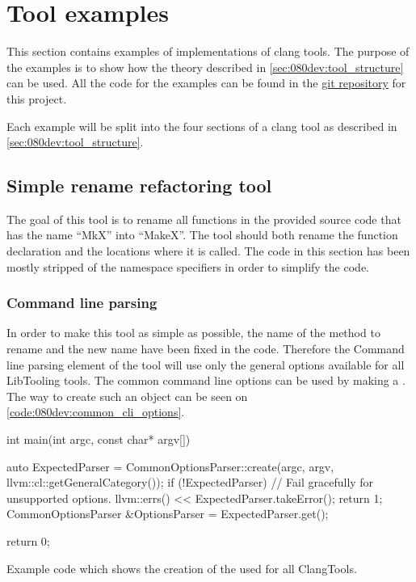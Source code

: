 \section{Tool examples}

This section contains examples of implementations of clang tools. The purpose of the examples is to show how the theory described in \cref{sec:080dev:tool_structure} can be used. All the code for the examples can be found in the \href{https://github.com/mortenhaahr/RD/tree/main/examples}{git repository} for this project. 

Each example will be split into the four sections of a clang tool as described in \cref{sec:080dev:tool_structure}.

\subsection{Simple rename refactoring tool}

The goal of this tool is to rename all functions in the provided source code that has the name ``MkX'' into ``MakeX''. The tool should both rename the function declaration and the locations where it is called. The code in this section has been mostly stripped of the namespace specifiers in order to simplify the code.

\subsubsection*{Command line parsing}

In order to make this tool as simple as possible, the name of the method to rename and the new name have been fixed in the code. Therefore the Command line parsing element of the tool will use only the general options available for all LibTooling tools. The common command line options can be used by making a . The way to create such an object can be seen on \cref{code:080dev:common_cli_options}.

\begin{listing}[H]
    \begin{cppcode}
int main(int argc, const char* argv[]) {
	auto ExpectedParser = CommonOptionsParser::create(argc, argv, llvm::cl::getGeneralCategory());
	if (!ExpectedParser) {
		// Fail gracefully for unsupported options.
		llvm::errs() << ExpectedParser.takeError();
		return 1;
	}
	CommonOptionsParser &OptionsParser = ExpectedParser.get();

    return 0;
}
    \end{cppcode}
    \caption{Example code which shows the creation of the  used for all ClangTools.}
    \label{code:080dev:common_cli_options}
\end{listing}

